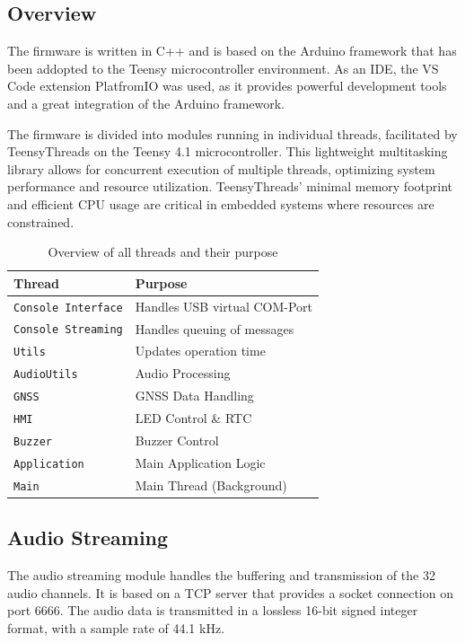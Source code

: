 \subsection{Overview}
The firmware is written in C++ and is based on the Arduino framework that has been addopted to the Teensy microcontroller environment.
As an IDE, the VS Code extension PlatfromIO was used, as it provides powerful development tools and a great integration of the Arduino framework.

The firmware is divided into modules running in individual threads, facilitated by TeensyThreads on the Teensy 4.1 microcontroller.
This lightweight multitasking library allows for concurrent execution of multiple threads, optimizing system performance and resource utilization.
TeensyThreads' minimal memory footprint and efficient CPU usage are critical in embedded systems where resources are constrained.


\begin{table}[h]
	\centering
	\begin{tabular}{|l|l|}
		\hline
		Thread                     & Purpose                      \\ \hline
		\texttt{Console Interface} & Handles USB virtual COM-Port \\ \hline
		\texttt{Console Streaming} & Handles queuing of messages  \\ \hline
		\texttt{Utils}             & Updates operation time       \\ \hline
		\texttt{AudioUtils}        & Audio Processing             \\ \hline
		\texttt{GNSS}              & GNSS Data Handling           \\ \hline
		\texttt{HMI}               & LED Control \& RTC           \\ \hline
		\texttt{Buzzer}            & Buzzer Control               \\ \hline
		\texttt{Application}       & Main Application Logic       \\ \hline
		\texttt{Main}              & Main Thread (Background)     \\ \hline
	\end{tabular}
	\caption{Overview of all threads and their purpose}
	\label{tab:threads}
\end{table}


\subsection{Audio Streaming}
The audio streaming module handles the buffering and transmission of the 32 audio channels.
It is based on a TCP server that provides a socket connection on port 6666.
The audio data is transmitted in a lossless 16-bit signed integer format, with a sample rate of 44.1 kHz.

